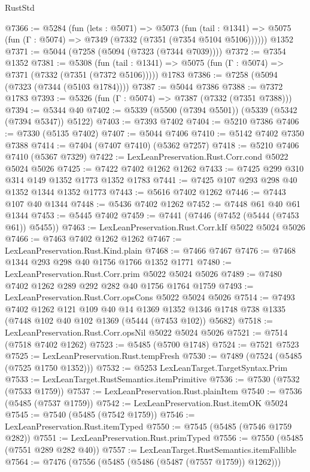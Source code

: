 \begin{lexlean}{RustStd}
\begin{coremodule}
@7366 := @5284
    (fun (lets : @5071) =>
    @5073
      (fun (tail : @1341) => @5075 (fun (Γ : @5074) => @7349 (@7332 (@7351 (@7354 @5104 @5106))))))
    @1352
@7371 := @5044 (@7258 (@5094 (@7323 (@7344 @7039))))
@7372 := @7354 @1352
@7381 := @5308
    (fun (tail : @1341) => @5075 (fun (Γ : @5074) => @7371 (@7332 (@7351 (@7372 @5106)))))
    @1783
@7386 := @7258 (@5094 (@7323 (@7344 (@5103 @1784))))
@7387 := @5044 @7386
@7388 := @7372 @1783
@7393 := @5326 (fun (Γ : @5074) => @7387 (@7332 (@7351 @7388)))
@7394 := @5344 @40
@7402 := @5339 (@5500 (@7394 @5501)) (@5339 (@5342 (@7394 @5347)) @5122)
@7403 := @7393 @7402
@7404 := @5210 @7386
@7406 := @7330 (@5135 @7402)
@7407 := @5044 @7406
@7410 := @5142 @7402 @7350 @7388
@7414 := @7404 (@7407 @7410) (@5362 @7257)
@7418 := @5210 @7406 @7410 (@5367 @7329)
@7422 := LexLeanPreservation.Rust.Corr.cond @5022 @5024 @5026
@7425 := @7422 @7402 @1262 @1262
@7433 := @7425 @299 @310 @314 @149 @1352 @1773 @1352 @1783
@7441 := @7425 @107 @293 @298 @40 @1352 @1344 @1352 @1773
@7443 := @5616 @7402 @1262
@7446 := @7443 @107 @40 @1344
@7448 := @5436 @7402 @1262
@7452 := @7448 @61 @40 @61 @1344
@7453 := @5445 @7402
@7459 := @7441 (@7446 (@7452 (@5444 (@7453 @61)) @5455))
@7463 := LexLeanPreservation.Rust.Corr.kIf @5022 @5024 @5026
@7466 := @7463 @7402 @1262 @1262
@7467 := LexLeanPreservation.Rust.Kind.plain
@7468 := @7466 @7467
@7476 := @7468 @1344 @293 @298 @40 @1756 @1766 @1352 @1771
@7480 := LexLeanPreservation.Rust.Corr.prim @5022 @5024 @5026
@7489 := @7480 @7402 @1262 @289 @292 @282 @40 @1756 @1764 @1759
@7493 := LexLeanPreservation.Rust.Corr.opsCons @5022 @5024 @5026
@7514 := @7493
    @7402
    @1262
    @121
    @109
    @40
    @14
    @1369
    @1352
    @1346
    @1748
    @738
    @1335
    (@7448 @102 @40 @102 @1369 (@5444 (@7453 @102)) @5682)
@7518 := LexLeanPreservation.Rust.Corr.opsNil @5022 @5024 @5026
@7521 := @7514 (@7518 @7402 @1262)
@7523 := @5485 (@5700 @1748)
@7524 := @7521 @7523
@7525 := LexLeanPreservation.Rust.tempFresh
@7530 := @7489 (@7524 (@5485 (@7525 @1750 @1352)))
@7532 := @5253 LexLeanTarget.TargetSyntax.Prim
@7533 := LexLeanTarget.RustSemantics.itemPrimitive
@7536 := @7530 (@7532 (@7533 @1759))
@7537 := LexLeanPreservation.Rust.plainItem
@7540 := @7536 (@5485 (@7537 @1759))
@7542 := LexLeanPreservation.Rust.itemOK @5024
@7545 := @7540 (@5485 (@7542 @1759))
@7546 := LexLeanPreservation.Rust.itemTyped
@7550 := @7545 (@5485 (@7546 @1759 @282))
@7551 := LexLeanPreservation.Rust.primTyped
@7556 := @7550 (@5485 (@7551 @289 @282 @40))
@7557 := LexLeanTarget.RustSemantics.itemFallible
@7564 := @7476 (@7556 (@5485 (@5486 (@5487 (@7557 @1759)) @1262)))

\end{coremodule}
\end{lexlean}
